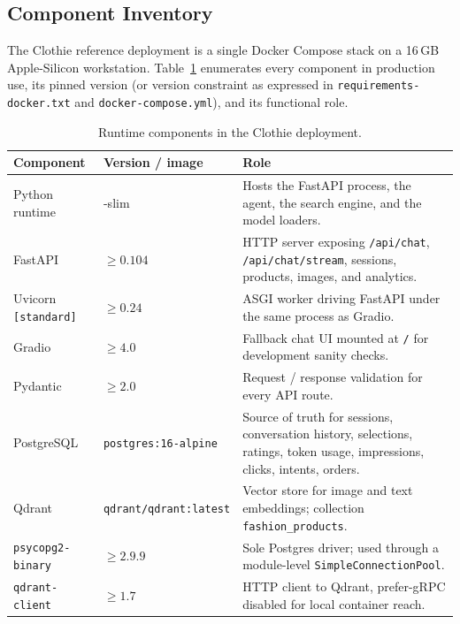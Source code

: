 \subsection{Component Inventory}

The Clothie reference deployment is a single Docker Compose stack on a 16\,GB Apple-Silicon workstation. Table~\ref{tab:impl_stack_components} enumerates every component in production use, its pinned version (or version constraint as expressed in \texttt{requirements-docker.txt} and \texttt{docker-compose.yml}), and its functional role.

\begin{table}[H]
\centering
\caption{Runtime components in the Clothie deployment.}
\label{tab:impl_stack_components}
\footnotesize
\begin{tabular}{>{\raggedright\arraybackslash}p{4.0cm} >{\raggedright\arraybackslash}p{3.0cm} >{\raggedright\arraybackslash}p{7.0cm}}
\toprule
\textbf{Component} & \textbf{Version / image} & \textbf{Role} \\
\midrule
Python runtime & 3.11-slim & Hosts the FastAPI process, the agent, the search engine, and the model loaders. \\
FastAPI & $\geq 0.104$ & HTTP server exposing \texttt{/api/chat}, \texttt{/api/chat/stream}, sessions, products, images, and analytics. \\
Uvicorn \texttt{[standard]} & $\geq 0.24$ & ASGI worker driving FastAPI under the same process as Gradio. \\
Gradio & $\geq 4.0$ & Fallback chat UI mounted at \texttt{/} for development sanity checks. \\
Pydantic & $\geq 2.0$ & Request / response validation for every API route. \\
PostgreSQL & \texttt{postgres:}\newline\texttt{16-alpine} & Source of truth for sessions, conversation history, selections, ratings, token usage, impressions, clicks, intents, orders. \\
Qdrant & \texttt{qdrant/}\newline\texttt{qdrant:latest} & Vector store for image and text embeddings; collection \texttt{fashion\_products}. \\
\texttt{psycopg2-binary} & $\geq 2.9.9$ & Sole Postgres driver; used through a module-level \texttt{SimpleConnectionPool}. \\
\texttt{qdrant-client} & $\geq 1.7$ & HTTP client to Qdrant, prefer-gRPC disabled for local container reach. \\

\end{tabular}
\end{table}
